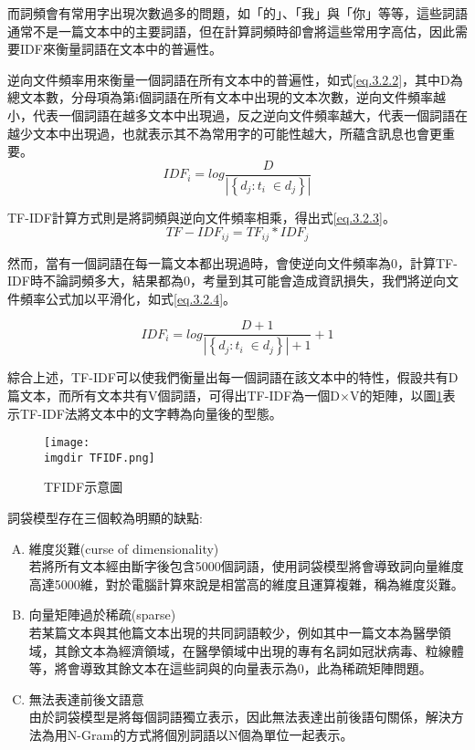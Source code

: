 	而詞頻會有常用字出現次數過多的問題，如「的」、「我」與「你」等等，這些詞語通常不是一篇文本中的主要詞語，但在計算詞頻時卻會將這些常用字高估，因此需要IDF來衡量詞語在文本中的普遍性。
	
	逆向文件頻率用來衡量一個詞語在所有文本中的普遍性，如式\ref{eq.3.2.2}，其中D為總文本數，分母項為第i個詞語在所有文本中出現的文本次數，逆向文件頻率越小，代表一個詞語在越多文本中出現過，反之逆向文件頻率越大，代表一個詞語在越少文本中出現過，也就表示其不為常用字的可能性越大，所蘊含訊息也會更重要。
\begin{equation}\label{eq.3.2.2}
IDF_{i} = log\frac{D}{\left | \left \{ d_j:t_i\; \in d_j \right \} \right |}
\end{equation}
	
	TF-IDF計算方式則是將詞頻與逆向文件頻率相乘，得出式\ref{eq.3.2.3}。
\begin{equation}\label{eq.3.2.3}
TF-IDF_{ij}= TF_{ij} * IDF_j
\end{equation}

	然而，當有一個詞語在每一篇文本都出現過時，會使逆向文件頻率為0，計算TF-IDF時不論詞頻多大，結果都為0，考量到其可能會造成資訊損失，我們將逆向文件頻率公式加以平滑化，如式\ref{eq.3.2.4}。
	
\begin{equation}\label{eq.3.2.4}
IDF_{i}=log\frac{D+1}{\left | \left \{ d_j:t_i\; \in d_j \right \} \right |+1}+1
\end{equation}

	綜合上述，TF-IDF可以使我們衡量出每一個詞語在該文本中的特性，假設共有D篇文本，而所有文本共有V個詞語，可得出TF-IDF為一個D$\times$V的矩陣，以圖\ref{grap.3.3.1}表示TF-IDF法將文本中的文字轉為向量後的型態。
	
\begin{figure}[H]
    \centering
        \texttt{[image: \\imgdir TFIDF.png]}
    \caption{TFIDF示意圖}
    \label{grap.3.3.1}
\end{figure}
	
	詞袋模型存在三個較為明顯的缺點:
\begin{enumerate}[A.]
\setlength{\itemsep}{-10pt}
\item 維度災難(curse of dimensionality)\\
	若將所有文本經由斷字後包含5000個詞語，使用詞袋模型將會導致詞向量維度高達5000維，對於電腦計算來說是相當高的維度且運算複雜，稱為維度災難。
\item 向量矩陣過於稀疏(sparse)\\
	若某篇文本與其他篇文本出現的共同詞語較少，例如其中一篇文本為醫學領域，其餘文本為經濟領域，在醫學領域中出現的專有名詞如冠狀病毒、粒線體等，將會導致其餘文本在這些詞與的向量表示為0，此為稀疏矩陣問題。
\item 無法表達前後文語意\\
	由於詞袋模型是將每個詞語獨立表示，因此無法表達出前後語句關係，解決方法為用N-Gram的方式將個別詞語以N個為單位一起表示。
\end{enumerate}
	
